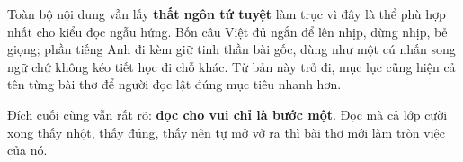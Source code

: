 Toàn bộ nội dung vẫn lấy \textbf{thất ngôn tứ tuyệt} làm trục vì đây là thể phù hợp nhất cho kiểu đọc ngẫu hứng. Bốn câu Việt đủ ngắn để lên nhịp, dừng nhịp, bẻ giọng; phần tiếng Anh đi kèm giữ tinh thần bài gốc, dùng như một cú nhấn song ngữ chứ không kéo tiết học đi chỗ khác. Từ bản này trở đi, mục lục cũng hiện cả tên từng bài thơ để người đọc lật đúng mục tiêu nhanh hơn.

Đích cuối cùng vẫn rất rõ: \textbf{đọc cho vui chỉ là bước một}. Đọc mà cả lớp cười xong thấy nhột, thấy đúng, thấy nên tự mở vở ra thì bài thơ mới làm tròn việc của nó.